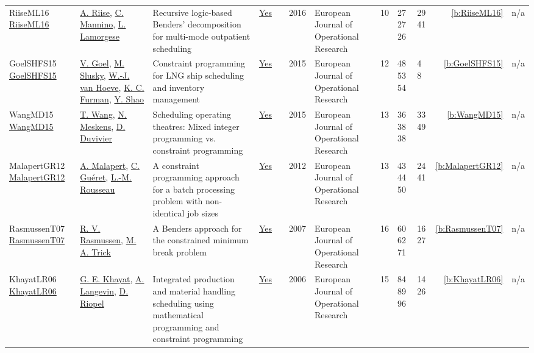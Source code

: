 {\begin{longtable}{>{\raggedright\arraybackslash}p{3cm}>{\raggedright\arraybackslash}p{4.5cm}>{\raggedright\arraybackslash}p{6.0cm}rrrp{2.5cm}rp{1cm}p{1cm}rr}
RiiseML16 \href{http://dx.doi.org/10.1016/j.ejor.2016.06.015}{RiiseML16} & \hyperref[auth:a1065]{A. Riise}, \hyperref[auth:a1066]{C. Mannino}, \hyperref[auth:a1067]{L. Lamorgese} & Recursive logic-based Benders' decomposition for multi-mode outpatient scheduling & \href{../works/RiiseML16.pdf}{Yes} & \cite{RiiseML16} & 2016 & European Journal of Operational Research & 10 & 27 27 26 & 29 41 & \ref{b:RiiseML16} & n/a\\
GoelSHFS15 \href{https://doi.org/10.1016/j.ejor.2014.09.048}{GoelSHFS15} & \hyperref[auth:a592]{V. Goel}, \hyperref[auth:a593]{M. Slusky}, \hyperref[auth:a206]{W.-J. van Hoeve}, \hyperref[auth:a594]{K. C. Furman}, \hyperref[auth:a595]{Y. Shao} & Constraint programming for {LNG} ship scheduling and inventory management & \href{../works/GoelSHFS15.pdf}{Yes} & \cite{GoelSHFS15} & 2015 & European Journal of Operational Research & 12 & 48 53 54 & 4 8 & \ref{b:GoelSHFS15} & n/a\\
WangMD15 \href{https://doi.org/10.1016/j.ejor.2015.06.008}{WangMD15} & \hyperref[auth:a596]{T. Wang}, \hyperref[auth:a597]{N. Meskens}, \hyperref[auth:a598]{D. Duvivier} & Scheduling operating theatres: Mixed integer programming vs. constraint programming & \href{../works/WangMD15.pdf}{Yes} & \cite{WangMD15} & 2015 & European Journal of Operational Research & 13 & 36 38 38 & 33 49 & \ref{b:WangMD15} & n/a\\
MalapertGR12 \href{http://dx.doi.org/10.1016/j.ejor.2012.04.008}{MalapertGR12} & \hyperref[auth:a82]{A. Malapert}, \hyperref[auth:a1376]{C. Guéret}, \hyperref[auth:a326]{L.-M. Rousseau} & \cellcolor{green!10}A constraint programming approach for a batch processing problem with non-identical job sizes & \href{../works/MalapertGR12.pdf}{Yes} & \cite{MalapertGR12} & 2012 & European Journal of Operational Research & 13 & 43 44 50 & 24 41 & \ref{b:MalapertGR12} & n/a\\
RasmussenT07 \href{http://dx.doi.org/10.1016/j.ejor.2005.10.063}{RasmussenT07} & \hyperref[auth:a1404]{R. V. Rasmussen}, \hyperref[auth:a1390]{M. A. Trick} & A Benders approach for the constrained minimum break problem & \href{../works/RasmussenT07.pdf}{Yes} & \cite{RasmussenT07} & 2007 & European Journal of Operational Research & 16 & 60 62 71 & 16 27 & \ref{b:RasmussenT07} & n/a\\
KhayatLR06 \href{https://doi.org/10.1016/j.ejor.2005.02.077}{KhayatLR06} & \hyperref[auth:a644]{G. E. Khayat}, \hyperref[auth:a645]{A. Langevin}, \hyperref[auth:a646]{D. Riopel} & Integrated production and material handling scheduling using mathematical programming and constraint programming & \href{../works/KhayatLR06.pdf}{Yes} & \cite{KhayatLR06} & 2006 & European Journal of Operational Research & 15 & 84 89 96 & 14 26 & \ref{b:KhayatLR06} & n/a\\

\end{longtable}}
